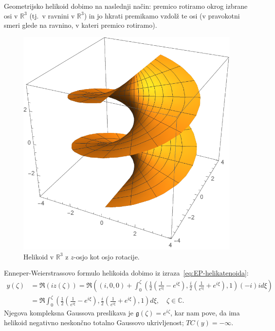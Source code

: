 \documentclass[12pt,a4paper,twoside]{article}
\theoremstyle{definition} %
\theoremstyle{plain} %
\numberwithin{equation}{section}  %
\begin{document}
Geometrijsko helikoid dobimo na naslednji način: premico rotiramo okrog izbrane osi v $\mathbb{R}^3$ (tj.~v ravnini v $\mathbb{R}^3$) in jo hkrati premikamo vzdolž te osi (v pravokotni smeri glede na ravnino, v kateri premico rotiramo).

\begin{figure}[h!]
\begin{center}
\includegraphics[scale=0.8]{images/helicoid.pdf}
\caption{Helikoid v $\mathbb{R}^3$ z $z$-osjo kot osjo rotacije.}
\end{center}
\end{figure}

Enneper-Weierstrassovo formulo helikoida dobimo iz izraza~\ref{eq:EP-helikatenoida}:
\begin{align}
y(\zeta) &= \Re (iz(\zeta)) = \Re \left( (i,0,0) + \int_{0}^{\zeta} \left( \frac{1}{2} \left(\frac{1}{e^{i\xi}} - e^{i\xi} \right), \frac{i}{2} \left(\frac{1}{e^{i\xi}} + e^{i\xi} \right), 1 \right) (-i) i d\xi \right) \nonumber \\
	&= \Re \int_{0}^{\zeta} \left( \frac{1}{2} \left(\frac{1}{e^{i\xi}} - e^{i\xi} \right), \frac{i}{2} \left(\frac{1}{e^{i\xi}} + e^{i\xi} \right), 1 \right) d\xi, \quad \zeta \in \mathbb{C}.
\end{align}
Njegova kompleksna Gaussova preslikava je $\mathfrak{g}(\zeta) = e^{i\zeta}$, kar nam pove, da ima helikoid negativno neskončno totalno Gaussovo ukrivljenost; $TC(y) = -\infty$. 
\end{document}
